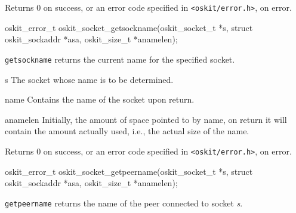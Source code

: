 \begin{apiret}
        Returns 0 on success, or an error code specified in
        {\tt <oskit/error.h>}, on error.
\end{apiret}

%
%

\begin{apisyn}

        \funcproto oskit_error_t
        oskit_socket_getsockname(oskit_socket_t *s,
		\outparam struct oskit_sockaddr *asa,
                \inoutparam oskit_size_t *anamelen);
\end{apisyn}

\begin{apidesc}
	\texttt{getsockname} returns the current name for the specified socket.
\end{apidesc}

\begin{apiparm}
        \item[s]
                The socket whose name is to be determined.

        \item[name]
                Contains the name of the socket upon return.

        \item[anamelen]
                Initially, the amount of space pointed to by name,
                on return it will contain the amount actually used, i.e.,
		the actual size of the name.

\end{apiparm}

\begin{apiret}
        Returns 0 on success, or an error code specified in
        {\tt <oskit/error.h>}, on error.
\end{apiret}

%
%

\begin{apisyn}

        \funcproto oskit_error_t
        oskit_socket_getpeername(oskit_socket_t *s,
		\outparam struct oskit_sockaddr *asa,
		\inoutparam oskit_size_t *anamelen);
\end{apisyn}

\begin{apidesc}
	\texttt{getpeername} returns the name of the peer connected to socket
	\emph{s}. 
\end{apidesc}

